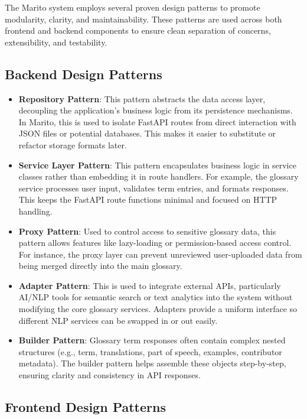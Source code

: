\documentclass[12pt]{article}
\begin{document}
The Marito system employs several proven design patterns to promote modularity, clarity, and maintainability. These patterns are used across both frontend and backend components to ensure clean separation of concerns, extensibility, and testability.

\subsection{Backend Design Patterns}

\begin{itemize}
    \item \textbf{Repository Pattern}: This pattern abstracts the data access layer, decoupling the application’s business logic from its persistence mechanisms. In Marito, this is used to isolate FastAPI routes from direct interaction with JSON files or potential databases. This makes it easier to substitute or refactor storage formats later.

    \item \textbf{Service Layer Pattern}: This pattern encapsulates business logic in service classes rather than embedding it in route handlers. For example, the glossary service processes user input, validates term entries, and formats responses. This keeps the FastAPI route functions minimal and focused on HTTP handling.

    \item \textbf{Proxy Pattern}: Used to control access to sensitive glossary data, this pattern allows features like lazy-loading or permission-based access control. For instance, the proxy layer can prevent unreviewed user-uploaded data from being merged directly into the main glossary.

    \item \textbf{Adapter Pattern}: This is used to integrate external APIs, particularly AI/NLP tools for semantic search or text analytics into the system without modifying the core glossary services. Adapters provide a uniform interface so different NLP services can be swapped in or out easily.

    \item \textbf{Builder Pattern}: Glossary term responses often contain complex nested structures (e.g., term, translations, part of speech, examples, contributor metadata). The builder pattern helps assemble these objects step-by-step, ensuring clarity and consistency in API responses.
\end{itemize}

\subsection{Frontend Design Patterns}
\end{document}
